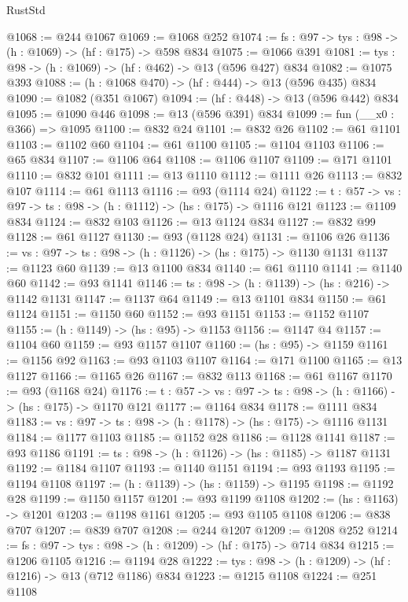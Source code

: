 \begin{lexlean}{RustStd}
\begin{coremodule}
@1068 := @244 @1067
@1069 := @1068 @252
@1074 := {fs : @97} -> {tys : @98} -> (h : @1069) -> (hf : @175) -> @598 @834
@1075 := @1066 @391
@1081 := {tys : @98} -> (h : @1069) -> (hf : @462) -> @13 (@596 @427) @834
@1082 := @1075 @393
@1088 := (h : @1068 @470) -> (hf : @444) -> @13 (@596 @435) @834
@1090 := @1082 (@351 @1067)
@1094 := (hf : @448) -> @13 (@596 @442) @834
@1095 := @1090 @446
@1098 := @13 (@596 @391) @834
@1099 := fun (__x0 : @366) => @1095
@1100 := @832 @24
@1101 := @832 @26
@1102 := @61 @1101
@1103 := @1102 @60
@1104 := @61 @1100
@1105 := @1104 @1103
@1106 := @65 @834
@1107 := @1106 @64
@1108 := @1106 @1107
@1109 := @171 @1101
@1110 := @832 @101
@1111 := @13 @1110
@1112 := @1111 @26
@1113 := @832 @107
@1114 := @61 @1113
@1116 := @93 (@1114 @24)
@1122 := {t : @57} -> {vs : @97} -> {ts : @98} -> (h : @1112) -> (hs : @175) -> @1116 @121
@1123 := @1109 @834
@1124 := @832 @103
@1126 := @13 @1124 @834
@1127 := @832 @99
@1128 := @61 @1127
@1130 := @93 (@1128 @24)
@1131 := @1106 @26
@1136 := {vs : @97} -> {ts : @98} -> (h : @1126) -> (hs : @175) -> @1130 @1131
@1137 := @1123 @60
@1139 := @13 @1100 @834
@1140 := @61 @1110
@1141 := @1140 @60
@1142 := @93 @1141
@1146 := {ts : @98} -> (h : @1139) -> (hs : @216) -> @1142 @1131
@1147 := @1137 @64
@1149 := @13 @1101 @834
@1150 := @61 @1124
@1151 := @1150 @60
@1152 := @93 @1151
@1153 := @1152 @1107
@1155 := (h : @1149) -> (hs : @95) -> @1153
@1156 := @1147 @4
@1157 := @1104 @60
@1159 := @93 @1157 @1107
@1160 := (hs : @95) -> @1159
@1161 := @1156 @92
@1163 := @93 @1103 @1107
@1164 := @171 @1100
@1165 := @13 @1127
@1166 := @1165 @26
@1167 := @832 @113
@1168 := @61 @1167
@1170 := @93 (@1168 @24)
@1176 := {t : @57} -> {vs : @97} -> {ts : @98} -> (h : @1166) -> (hs : @175) -> @1170 @121
@1177 := @1164 @834
@1178 := @1111 @834
@1183 := {vs : @97} -> {ts : @98} -> (h : @1178) -> (hs : @175) -> @1116 @1131
@1184 := @1177 @1103
@1185 := @1152 @28
@1186 := @1128 @1141
@1187 := @93 @1186
@1191 := {ts : @98} -> (h : @1126) -> (hs : @1185) -> @1187 @1131
@1192 := @1184 @1107
@1193 := @1140 @1151
@1194 := @93 @1193
@1195 := @1194 @1108
@1197 := (h : @1139) -> (hs : @1159) -> @1195
@1198 := @1192 @28
@1199 := @1150 @1157
@1201 := @93 @1199 @1108
@1202 := (hs : @1163) -> @1201
@1203 := @1198 @1161
@1205 := @93 @1105 @1108
@1206 := @838 @707
@1207 := @839 @707
@1208 := @244 @1207
@1209 := @1208 @252
@1214 := {fs : @97} -> {tys : @98} -> (h : @1209) -> (hf : @175) -> @714 @834
@1215 := @1206 @1105
@1216 := @1194 @28
@1222 := {tys : @98} -> (h : @1209) -> (hf : @1216) -> @13 (@712 @1186) @834
@1223 := @1215 @1108
@1224 := @251 @1108

\end{coremodule}
\end{lexlean}
